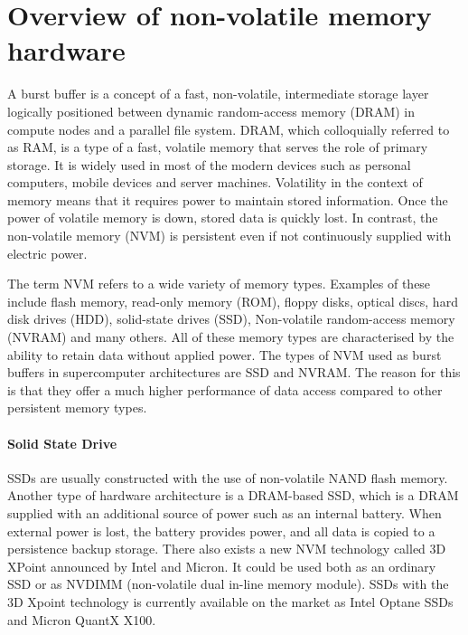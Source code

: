 \documentclass[thesis-en.tex]{subfiles}
\begin{document}
\section{Overview of non-volatile memory hardware}
A burst buffer is a concept of a fast, non-volatile, intermediate storage layer logically positioned between dynamic random-access memory (DRAM) in compute nodes and a parallel file system. DRAM, which colloquially referred to as RAM, is a type of a fast, volatile memory that serves the role of primary storage. It is widely used in most of the modern devices such as personal computers, mobile devices and server machines. Volatility in the context of memory means that it requires power to maintain stored information. Once the power of volatile memory is down, stored data is quickly lost. In contrast, the non-volatile memory (NVM) is persistent even if not continuously supplied with electric power.

The term NVM refers to a wide variety of memory types. Examples of these include flash memory, read-only memory (ROM), floppy disks, optical discs, hard disk drives (HDD), solid-state drives (SSD), Non-volatile random-access memory (NVRAM) and many others. All of these memory types are characterised by the ability to retain data without applied power. The types of NVM used as burst buffers in supercomputer architectures are SSD and NVRAM. The reason for this is that they offer a much higher performance of data access compared to other persistent memory types.

\paragraph{Solid State Drive}
SSDs are usually constructed with the use of non-volatile NAND flash memory. Another type of hardware architecture is a DRAM-based SSD, which is a DRAM supplied with an additional source of power such as an internal battery. When external power is lost, the battery provides power, and all data is copied to a persistence backup storage. There also exists a new NVM technology called 3D XPoint announced by Intel and Micron. It could be used both as an ordinary SSD or as NVDIMM (non-volatile dual in-line memory module). SSDs with the 3D Xpoint technology is currently available on the market as Intel Optane SSDs and Micron QuantX X100.
\end{document}

